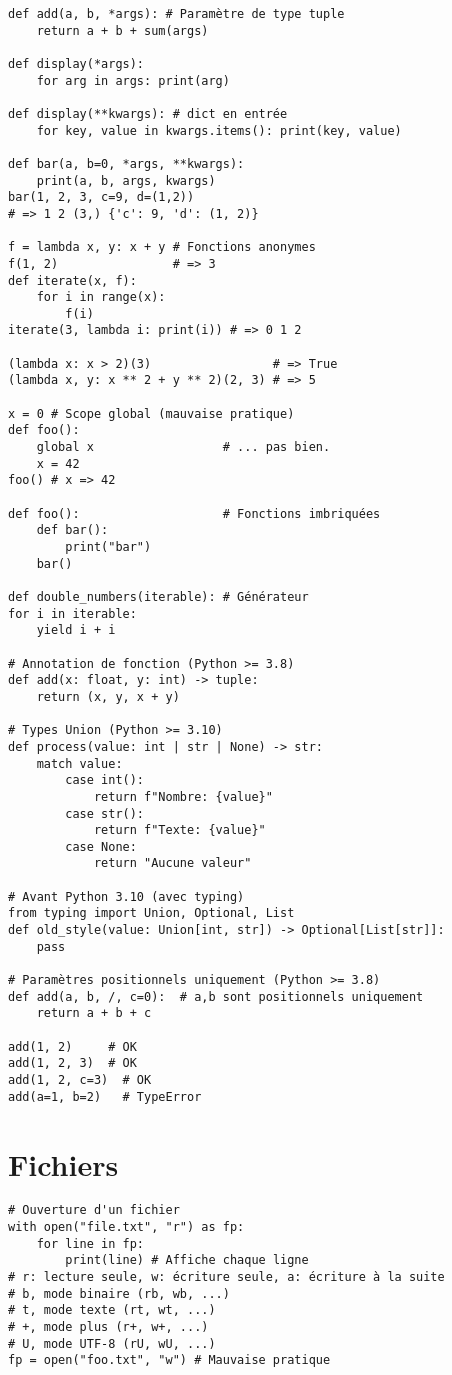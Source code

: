 \documentclass{article}
\begin{document}
\begin{multicols*}{4}
\begin{lstlisting}
def add(a, b, *args): # Paramètre de type tuple
    return a + b + sum(args)

def display(*args):
    for arg in args: print(arg)

def display(**kwargs): # dict en entrée
    for key, value in kwargs.items(): print(key, value)

def bar(a, b=0, *args, **kwargs):
    print(a, b, args, kwargs)
bar(1, 2, 3, c=9, d=(1,2))
# => 1 2 (3,) {'c': 9, 'd': (1, 2)}

f = lambda x, y: x + y # Fonctions anonymes
f(1, 2)                # => 3
def iterate(x, f):
    for i in range(x):
        f(i)
iterate(3, lambda i: print(i)) # => 0 1 2

(lambda x: x > 2)(3)                 # => True
(lambda x, y: x ** 2 + y ** 2)(2, 3) # => 5

x = 0 # Scope global (mauvaise pratique)
def foo():
    global x                  # ... pas bien.
    x = 42
foo() # x => 42

def foo():                    # Fonctions imbriquées
    def bar():
        print("bar")
    bar()

def double_numbers(iterable): # Générateur
for i in iterable:
    yield i + i

# Annotation de fonction (Python >= 3.8)
def add(x: float, y: int) -> tuple:
    return (x, y, x + y)

# Types Union (Python >= 3.10)
def process(value: int | str | None) -> str:
    match value:
        case int():
            return f"Nombre: {value}"
        case str():
            return f"Texte: {value}"
        case None:
            return "Aucune valeur"

# Avant Python 3.10 (avec typing)
from typing import Union, Optional, List
def old_style(value: Union[int, str]) -> Optional[List[str]]:
    pass

# Paramètres positionnels uniquement (Python >= 3.8)
def add(a, b, /, c=0):  # a,b sont positionnels uniquement
    return a + b + c

add(1, 2)     # OK
add(1, 2, 3)  # OK  
add(1, 2, c=3)  # OK
add(a=1, b=2)   # TypeError
\end{lstlisting}

\section*{Fichiers}
\begin{lstlisting}
# Ouverture d'un fichier
with open("file.txt", "r") as fp:
    for line in fp:
        print(line) # Affiche chaque ligne
# r: lecture seule, w: écriture seule, a: écriture à la suite
# b, mode binaire (rb, wb, ...)
# t, mode texte (rt, wt, ...)
# +, mode plus (r+, w+, ...)
# U, mode UTF-8 (rU, wU, ...)
fp = open("foo.txt", "w") # Mauvaise pratique
\end{lstlisting}


\end{multicols*}
\end{document}

